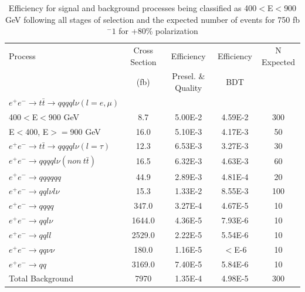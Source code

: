 \begin{table}
  \centering
  \begin{tabular}{l | c | c | c | c}
    \toprule
    Process     & Cross Section & Efficiency & Efficiency & N Expected\\
         & (fb) & Presel. \& Quality & BDT & \\
    \midrule
    $e^+e^-\rightarrow t\bar{t} \rightarrow qqqql\nu (l=e,\mu)$ &  & \\
    400$<$E$<$900 GeV & 8.7 & 5.00E-2 & 4.59E-2 & 300\\
    E$<$400, E$>=$900 GeV & 16.0 & 5.10E-3 & 4.17E-3 & 50\\
   \midrule
    $e^+e^-\rightarrow t\bar{t} \rightarrow qqqql\nu (l=\tau)$& 12.3 & 6.53E-3 & 3.27E-3 & 30\\
    \midrule
    $e^+e^-\rightarrow qqqql\nu (non ~ t\bar{t})$& 16.5 & 6.32E-3 & 4.63E-3 & 60\\
    \midrule
    $e^+e^-\rightarrow qqqqqq$ & 44.9 & 2.89E-3 & 4.81E-4 & 20 \\
    \midrule
    $e^+e^-\rightarrow qql\nu l\nu$ & 15.3  & 1.33E-2 & 8.55E-3 & 100 \\
    \midrule
    $e^+e^-\rightarrow qqqq$ & 347.0 & 3.27E-4 & 4.67E-5 & 10 \\
    \midrule
    $e^+e^-\rightarrow qql\nu$ & 1644.0 & 4.36E-5 & 7.93E-6 & 10\\
    \midrule
    $e^+e^-\rightarrow qqll$ & 2529.0 & 2.22E-5 & 5.54E-6 & 10 \\
    \midrule
    $e^+e^-\rightarrow qq\nu\nu$ & 180.0 & 1.16E-5 & $<$E-6 & 10 \\
    \midrule
    $e^+e^-\rightarrow qq$ & 3169.0 & 7.40E-5 & 5.84E-6 & 10 \\
    \midrule
    \midrule
    Total Background & 7970 & 1.35E-4 & 4.98E-5 & 300\\
    \bottomrule
  \end{tabular}
  \caption{Efficiency for signal and background processes being classified as 400$<$E$<$900 GeV following all stages of selection and the expected number of events for 750 fb$^-1$ for +80\% polarization}
  \label{table:topfinalefficienciesposLowE}
\end{table}


